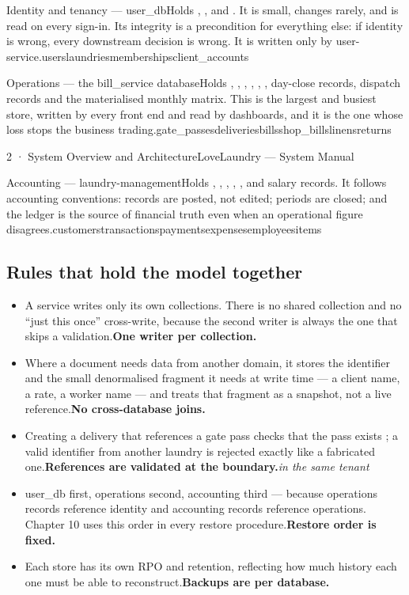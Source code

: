 \documentclass[11pt,a4paper,oneside]{book}
\begin{document}
Identity and tenancy — user\_dbHolds , , and . It is small, changes rarely, and is read on every sign-in. Its integrity is a precondition for everything else: if identity is wrong, every downstream decision is wrong. It is written only by user-service.userslaundriesmembershipsclient\_accounts

Operations — the bill\_service databaseHolds , , , , , , day-close records, dispatch records and the materialised monthly matrix. This is the largest and busiest store, written by every front end and read by dashboards, and it is the one whose loss stops the business trading.gate\_passesdeliveriesbillsshop\_billslinensreturns

2 · System Overview and ArchitectureLoveLaundry — System Manual

Accounting — laundry-managementHolds , , , , , and salary records. It follows accounting conventions: records are posted, not edited; periods are closed; and the ledger is the source of financial truth even when an operational figure disagrees.customerstransactionspaymentsexpensesemployeesitems

\subsection*{Rules that hold the model together}
\begin{itemize}
\item A service writes only its own collections. There is no shared collection and no “just this once” cross-write, because the second writer is always the one that skips a validation.\textbf{One writer per collection.}
\item Where a document needs data from another domain, it stores the identifier and the small denormalised fragment it needs at write time — a client name, a rate, a worker name — and treats that fragment as a snapshot, not a live reference.\textbf{No cross-database joins.}
\item Creating a delivery that references a gate pass checks that the pass exists ; a valid identifier from another laundry is rejected exactly like a fabricated one.\textbf{References are validated at the boundary.}\emph{in the same tenant}
\item user\_db first, operations second, accounting third — because operations records reference identity and accounting records reference operations. Chapter 10 uses this order in every restore procedure.\textbf{Restore order is fixed.}
\item Each store has its own RPO and retention, reflecting how much history each one must be able to reconstruct.\textbf{Backups are per database.}
\end{itemize}
\end{document}
